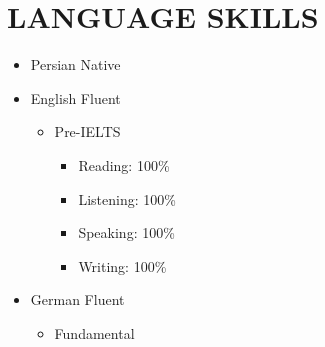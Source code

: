 \documentclass[10pt,a4paper,sans]{moderncv} %
\begin{document}
	\section{LANGUAGE SKILLS}
	
	\begin{itemize}
	\item Persian \hspace{5 pt} Native
	\item English \hspace{6 pt} Fluent   
		\begin{itemize}
			 \item Pre-IELTS
			 \begin{itemize}
			 	\item Reading: 100\% \item Listening: 100\% \item Speaking: 100\% \item Writing: 100\%
		 	\end{itemize}
		\end{itemize}
	\item German \hspace{6 pt} Fluent   
		\begin{itemize}
			 \item Fundamental
		\end{itemize}
	\end{itemize} 

	
	
	
\end{document}
